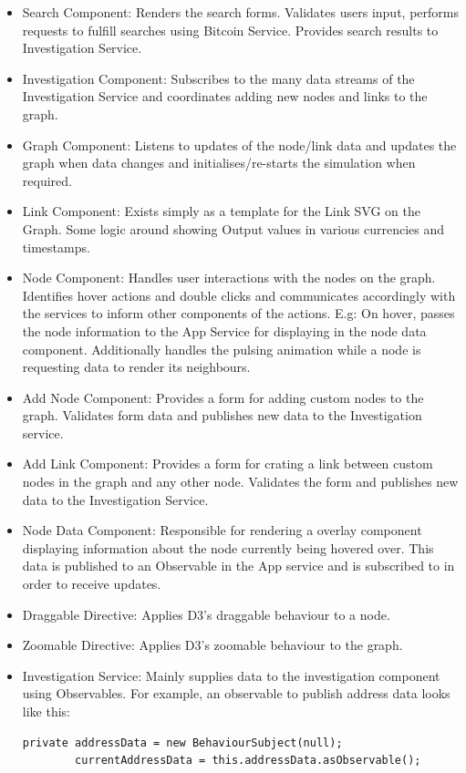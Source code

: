 \begin{itemize}
    \item Search Component: Renders the search forms. Validates users input, performs requests to fulfill searches using Bitcoin Service. Provides search results to Investigation Service. 
    \item Investigation Component: Subscribes to the many data streams of the Investigation Service and coordinates adding new nodes and links to the graph. 
    \item Graph Component: Listens to updates of the node/link data and updates the graph when data changes and initialises/re-starts the simulation when required. 
    \item Link Component: Exists simply as a template for the Link SVG on the Graph. Some logic around showing Output values in various currencies and timestamps. 
    \item Node Component: Handles user interactions with the nodes on the graph. Identifies hover actions and double clicks and communicates accordingly with the services to inform other components of the actions. E.g: On hover, passes the node information to the App Service for displaying in the node data component. Additionally handles the pulsing animation while a node is requesting data to render its neighbours. 
    \item Add Node Component: Provides a form for adding custom nodes to the graph. Validates form data and publishes new data to the Investigation service.  
    \item Add Link Component: Provides a form for crating a link between custom nodes in the graph and any other node. Validates the form and publishes new data to the Investigation Service. 
    \item Node Data Component: Responsible for rendering a overlay component displaying information about the node currently being hovered over. This data is published to an Observable in the App service and is subscribed to in order to receive updates. 
    \item Draggable Directive: Applies D3's draggable behaviour to a node. 
    \item Zoomable Directive: Applies D3's zoomable behaviour to the graph. 
    \item Investigation Service: Mainly supplies data to the investigation component using Observables. For example, an observable to publish address data looks like this:
    \begin{lstlisting}[breaklines=true, basicstyle=\small]
        private addressData = new BehaviourSubject(null);
        currentAddressData = this.addressData.asObservable();
        

\end{lstlisting}
\end{itemize}
